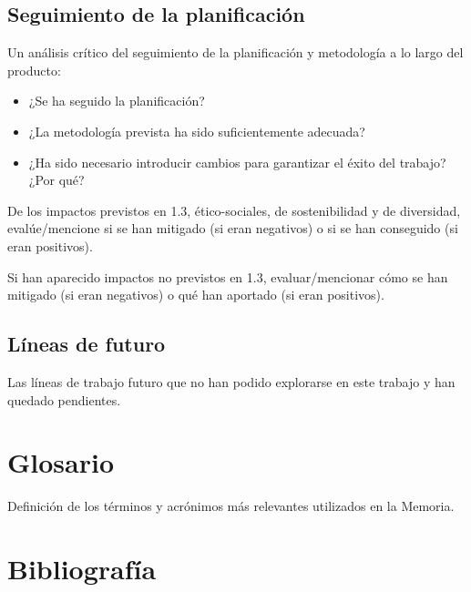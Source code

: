 \documentclass{uoc_memoria}
\begin{document}
\subsection{Seguimiento de la planificación}

\begin{guidancebox}
Un análisis crítico del seguimiento de la planificación y metodología a lo largo del producto:
\begin{itemize}
  \item ¿Se ha seguido la planificación?
  \item ¿La metodología prevista ha sido suficientemente adecuada?
  \item ¿Ha sido necesario introducir cambios para garantizar el éxito del trabajo? ¿Por qué?
\end{itemize}

De los impactos previstos en 1.3, ético-sociales, de sostenibilidad y de diversidad, evalúe/mencione si se han mitigado (si eran negativos) o si se han conseguido (si eran positivos).

Si han aparecido impactos no previstos en 1.3, evaluar/mencionar cómo se han mitigado (si eran negativos) o qué han aportado (si eran positivos).
\end{guidancebox}

\subsection{Líneas de futuro}

\begin{guidancebox}
Las líneas de trabajo futuro que no han podido explorarse en este trabajo y han quedado pendientes.
\end{guidancebox}

\clearpage
\section{Glosario}

\begin{guidancebox}
Definición de los términos y acrónimos más relevantes utilizados en la Memoria.
\end{guidancebox}

\clearpage
\section{Bibliografía}
\end{document}
